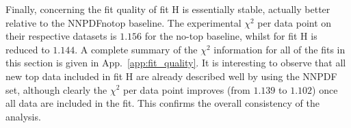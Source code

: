 \documentclass[withindex,glossary]{cam-thesis}
\begin{document}
Finally, concerning the fit quality of fit H is essentially stable, actually 
better relative to the NNPDFnotop baseline. The experimental $\chi^2$ per data point on
their respective datasets is $1.156$ for the no-top baseline, whilst for
fit H is reduced to $1.144$. A complete summary of the $\chi^2$ information
for all of the fits in this section is given in App.~\ref{app:fit_quality}.
It is interesting to observe that all new top data included in fit H are
already described well by using the NNPDF set, although clearly the $\chi^2$
per data point improves (from $1.139$ to $1.102$) once all data are included
in the fit. This confirms the overall consistency of the analysis. 





\end{document}
